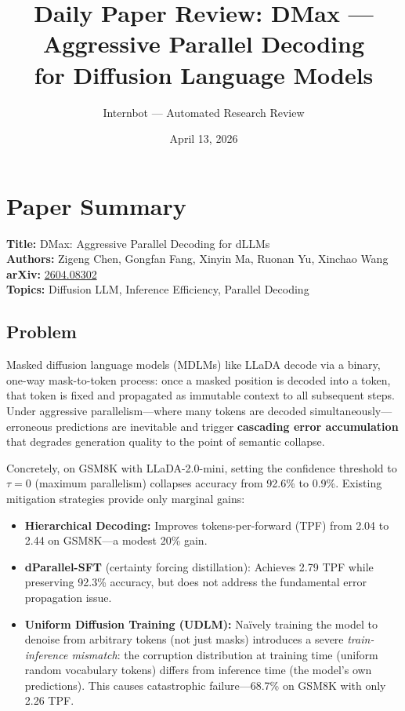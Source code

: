 \documentclass[11pt]{article}
\title{Daily Paper Review: DMax --- Aggressive Parallel Decoding\\for Diffusion Language Models}
\author{Internbot --- Automated Research Review}
\date{April 13, 2026}
\begin{document}
\maketitle

\section{Paper Summary}

\textbf{Title:} DMax: Aggressive Parallel Decoding for dLLMs \\
\textbf{Authors:} Zigeng Chen, Gongfan Fang, Xinyin Ma, Ruonan Yu, Xinchao Wang \\
\textbf{arXiv:} \href{https://arxiv.org/abs/2604.08302}{2604.08302} \\
\textbf{Topics:} Diffusion LLM, Inference Efficiency, Parallel Decoding

\subsection{Problem}

Masked diffusion language models (MDLMs) like LLaDA decode via a binary, one-way mask-to-token process: once a masked position is decoded into a token, that token is fixed and propagated as immutable context to all subsequent steps. Under aggressive parallelism---where many tokens are decoded simultaneously---erroneous predictions are inevitable and trigger \textbf{cascading error accumulation} that degrades generation quality to the point of semantic collapse.

Concretely, on GSM8K with LLaDA-2.0-mini, setting the confidence threshold to $\tau = 0$ (maximum parallelism) collapses accuracy from 92.6\% to 0.9\%. Existing mitigation strategies provide only marginal gains:

\begin{itemize}
    \item \textbf{Hierarchical Decoding:} Improves tokens-per-forward (TPF) from 2.04 to 2.44 on GSM8K---a modest 20\% gain.
    \item \textbf{dParallel-SFT} (certainty forcing distillation): Achieves 2.79 TPF while preserving 92.3\% accuracy, but does not address the fundamental error propagation issue.
    \item \textbf{Uniform Diffusion Training (UDLM):} Na\"ively training the model to denoise from arbitrary tokens (not just masks) introduces a severe \textit{train-inference mismatch}: the corruption distribution at training time (uniform random vocabulary tokens) differs from inference time (the model's own predictions). This causes catastrophic failure---68.7\% on GSM8K with only 2.26 TPF.
\end{itemize}
\end{document}
